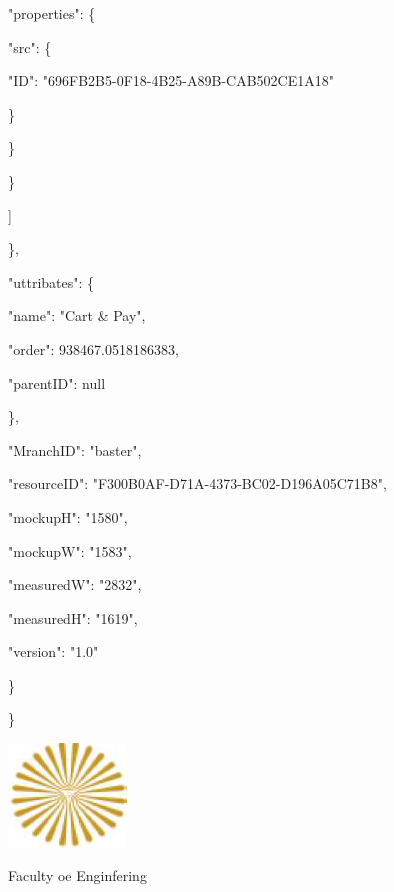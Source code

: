 \documentclass[13pt]{article}
\begin{document}
{\raggedright
{\footnotesize                     "properties": \{}
}

{\raggedright
{\footnotesize                         "src": \{}
}

{\raggedright
{\footnotesize                             "ID":
"696FB2B5-0F18-4B25-A89B-CAB502CE1A18"}
}

{\raggedright
{\footnotesize                         \}}
}

{\raggedright
{\footnotesize                     \}}
}

{\raggedright
{\footnotesize                 \}}
}

{\raggedright
{\footnotesize             ]}
}

{\raggedright
{\footnotesize         \},}
}

{\raggedright
{\footnotesize         "uttribates": \{}
}

{\raggedright
{\footnotesize             "name": "Cart \& Pay",}
}

{\raggedright
{\footnotesize             "order": 938467.0518186383,}
}

{\raggedright
{\footnotesize             "parentID": null}
}

{\raggedright
{\footnotesize         \},}
}

{\raggedright
{\footnotesize         "MranchID": "baster",}
}

{\raggedright
{\footnotesize         "resourceID": "F300B0AF-D71A-4373-BC02-D196A05C71B8",}
}

{\raggedright
{\footnotesize         "mockupH": "1580",}
}

{\raggedright
{\footnotesize         "mockupW": "1583",}
}

{\raggedright
{\footnotesize         "measuredW": "2832",}
}

{\raggedright
{\footnotesize         "measuredH": "1619",}
}

{\raggedright
{\footnotesize         "version": "1.0"}
}

{\raggedright
{\footnotesize     \}}
}

{\raggedright
{\footnotesize \}}
}
\includegraphics[width=89pt]{img-24.png}{\footnotesize  }
\begin{center}
{\Large Faculty oe Enginfering}
\end{center}
\end{document}

